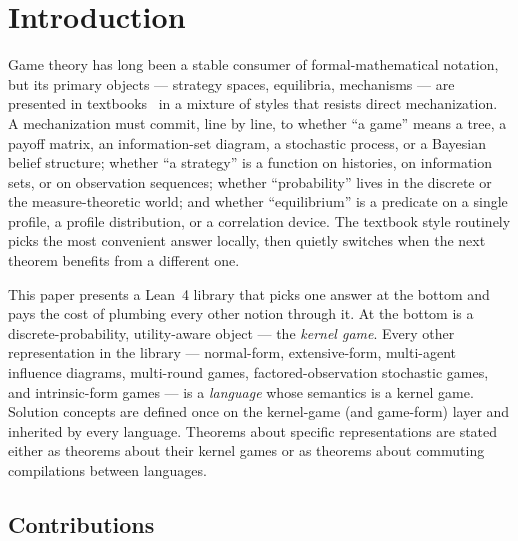 \section{Introduction}
\label{sec:introduction}

Game theory has long been a stable consumer of formal-mathematical
notation, but its primary objects — strategy spaces, equilibria,
mechanisms — are presented in textbooks~\citep{OsborneRubinstein1994,
MaschlerSolanZamir2013, ShohamLeytonBrown2008, Myerson1991} in a
mixture of styles that resists direct mechanization.  A
mechanization must commit, line by line, to whether ``a game'' means
a tree, a payoff matrix, an information-set diagram, a stochastic
process, or a Bayesian belief structure; whether ``a strategy'' is a
function on histories, on information sets, or on observation
sequences; whether ``probability'' lives in the discrete or the
measure-theoretic world; and whether ``equilibrium'' is a predicate
on a single profile, a profile distribution, or a correlation
device.  The textbook style routinely picks the most convenient
answer locally, then quietly switches when the next theorem
benefits from a different one.

This paper presents a Lean~4 library that picks one answer at the
bottom and pays the cost of plumbing every other notion through it.
At the bottom is a discrete-probability, utility-aware object — the
\emph{kernel game}.  Every other representation in the library —
normal-form, extensive-form, multi-agent influence diagrams,
multi-round games, factored-observation stochastic games, and
intrinsic-form games — is a \emph{language} whose semantics is a
kernel game.  Solution concepts are defined once on the kernel-game
(and game-form) layer and inherited by every language.  Theorems
about specific representations are stated either as theorems about
their kernel games or as theorems about commuting compilations
between languages.

\subsection{Contributions}

